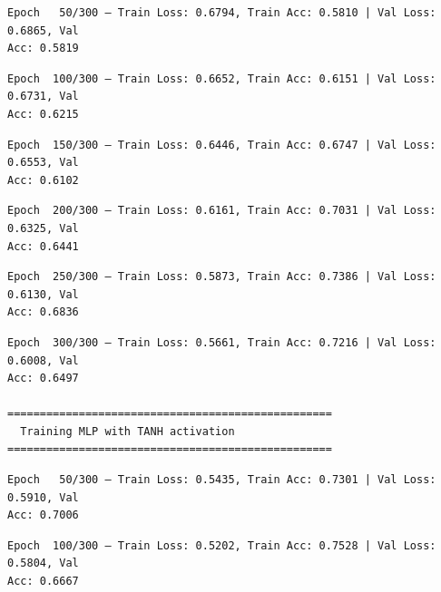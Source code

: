 \documentclass[11pt]{article}
\begin{document}
    \begin{Verbatim}[commandchars=\\\{\}]
Epoch   50/300 — Train Loss: 0.6794, Train Acc: 0.5810 | Val Loss: 0.6865, Val
Acc: 0.5819
    \end{Verbatim}

    \begin{Verbatim}[commandchars=\\\{\}]
Epoch  100/300 — Train Loss: 0.6652, Train Acc: 0.6151 | Val Loss: 0.6731, Val
Acc: 0.6215
    \end{Verbatim}

    \begin{Verbatim}[commandchars=\\\{\}]
Epoch  150/300 — Train Loss: 0.6446, Train Acc: 0.6747 | Val Loss: 0.6553, Val
Acc: 0.6102
    \end{Verbatim}

    \begin{Verbatim}[commandchars=\\\{\}]
Epoch  200/300 — Train Loss: 0.6161, Train Acc: 0.7031 | Val Loss: 0.6325, Val
Acc: 0.6441
    \end{Verbatim}

    \begin{Verbatim}[commandchars=\\\{\}]
Epoch  250/300 — Train Loss: 0.5873, Train Acc: 0.7386 | Val Loss: 0.6130, Val
Acc: 0.6836
    \end{Verbatim}

    \begin{Verbatim}[commandchars=\\\{\}]
Epoch  300/300 — Train Loss: 0.5661, Train Acc: 0.7216 | Val Loss: 0.6008, Val
Acc: 0.6497

==================================================
  Training MLP with TANH activation
==================================================
    \end{Verbatim}

    \begin{Verbatim}[commandchars=\\\{\}]
Epoch   50/300 — Train Loss: 0.5435, Train Acc: 0.7301 | Val Loss: 0.5910, Val
Acc: 0.7006
    \end{Verbatim}

    \begin{Verbatim}[commandchars=\\\{\}]
Epoch  100/300 — Train Loss: 0.5202, Train Acc: 0.7528 | Val Loss: 0.5804, Val
Acc: 0.6667
    \end{Verbatim}
\end{document}
